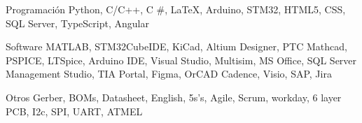 


\begin{cvskills}


\cvskill
{Programación} %
{Python, C/C++, C \#, LaTeX, Arduino, STM32, HTML5, CSS, SQL Server, TypeScript, Angular} %


\cvskill
{Software} %
{MATLAB, STM32CubeIDE, KiCad, Altium Designer, PTC Mathcad, PSPICE, LTSpice, Arduino IDE, Visual Studio, Multisim, MS Office, SQL Server Management Studio, TIA Portal, Figma, OrCAD Cadence, Visio, SAP, Jira} %

\cvskill
{Otros} %
{Gerber, BOMs, Datasheet, English, 5s's, Agile, Scrum, workday, 6 layer PCB, I2c, SPI, UART, ATMEL} %


\end{cvskills}